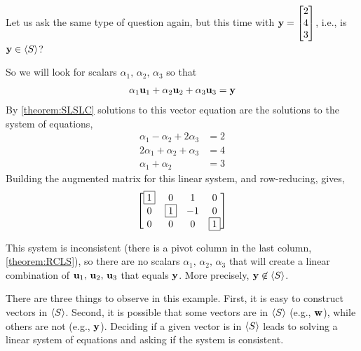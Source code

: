 \documentclass{ximera}
\begin{document}
\begin{example}
    
  \begin{question}
    Let us ask the same type of question again, but this time with
    $\mathbf{y}=\begin{bmatrix}2\\4\\3\end{bmatrix}$, i.e., is $\mathbf{y}\in\left\langle S\right\rangle$?

    \begin{multipleChoice}
    \end{multipleChoice}

    \begin{feedback}[correct]
      So we will look for scalars $\alpha_1,\,\alpha_2,\,\alpha_3$ so that
      \begin{align*}
        \alpha_1\mathbf{u}_1+\alpha_2\mathbf{u}_2+\alpha_3\mathbf{u}_3&=\mathbf{y}\\
      \end{align*}
      By \ref{theorem:SLSLC} solutions to this vector equation are the solutions to the system of equations,
      \begin{align*}
        \alpha_1-\alpha_2+2\alpha_3&=2\\
        2\alpha_1+\alpha_2+\alpha_3&=4\\
        \alpha_1+\alpha_2&=3
      \end{align*}
      Building the augmented matrix for this linear system, and row-reducing, gives,
      \[
        \begin{bmatrix}
          \fbox{1} & 0 & 1 & 0\\
          0 & \fbox{1} & -1 & 0\\
          0 & 0 & 0 & \fbox{1}
        \end{bmatrix}
      \]
      
      This system is inconsistent (there is a pivot column in the last
      column, \ref{theorem:RCLS}), so there are no scalars
      $\alpha_1,\,\alpha_2,\,\alpha_3$ that will create a linear
      combination of $\mathbf{u}_1,\,\mathbf{u}_2,\,\mathbf{u}_3$ that equals
      $\mathbf{y}$.  More precisely, $\mathbf{y}\not\in\left\langle S\right\rangle$.
    \end{feedback}
  \end{question}

  There are three things to observe in this example.  First, it is
  easy to construct vectors in $\left\langle S\right\rangle$.  Second, it is possible that
  some vectors are in $\left\langle S\right\rangle$ (e.g., $\mathbf{w}$), while others are
  not (e.g., $\mathbf{y}$).  Deciding if a given vector is in $\left\langle S\right\rangle$
  leads to solving a linear system of equations and asking if the
  system is consistent.

\end{example}
\end{document}
